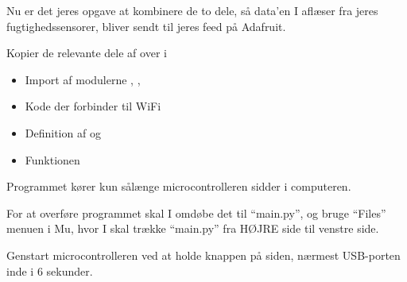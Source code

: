 \documentclass{ucph-handout}
\newcounter{handout}
\newcommand{\Ark}{Arbejdsark \arabic{handout}: }
\renewcommand{\Title}{\Ark LED-strip}%
\begin{document}
\begin{exercisebox}[adjusted title=Send luftfugtighedsdata]
  Nu er det jeres opgave at kombinere de to dele, så data'en I aflæser
  fra jeres fugtighedssensorer, bliver sendt til jeres feed på
  Adafruit.

  Kopier de relevante dele af  over i 
  \begin{itemize}
  \item Import af modulerne , , 
  \item Kode der forbinder til WiFi
  \item Definition af  og 
  \item Funktionen 
    \vspace{-1mm}
  \end{itemize}
\end{exercisebox}

\begin{exercisebox}[adjusted title=Overfør program til microcontroller]
  Programmet kører kun sålænge microcontrolleren sidder i computeren.

  For at overføre programmet skal I omdøbe det til "`main.py"', og
  bruge "`Files"' menuen i Mu, hvor I skal trække "`main.py"' fra HØJRE side til
  venstre side.

  Genstart microcontrolleren ved at holde knappen på siden,
  nærmest USB-porten inde i 6 sekunder.
\end{exercisebox}


  




\end{document}
